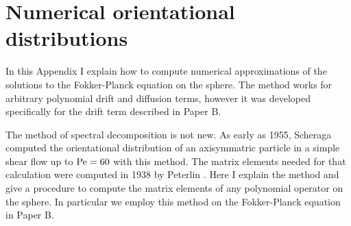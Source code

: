 \documentclass[thesis.tex]{subfiles}
\begin{document}
\chapter{Numerical orientational distributions}\label{app:fpe_sphere}

In this Appendix I explain how to compute numerical approximations of the solutions to the Fokker-Planck equation on the sphere. The method works for arbitrary polynomial drift and diffusion terms, however it was developed specifically for the drift term described in Paper B.

The method of spectral decomposition is not new. As early as 1955, Scheraga \cite{scheraga1955} computed the orientational distribution of an axisymmatric particle in a simple shear flow up to $\mbox{Pe}=60$ with this method. The matrix elements needed for that calculation were computed in 1938 by Peterlin \cite{peterlin1938}. Here I explain the method and give a procedure to compute the matrix elements of any polynomial operator on the sphere. In particular we employ this method on the Fokker-Planck equation in Paper B.
\end{document}
